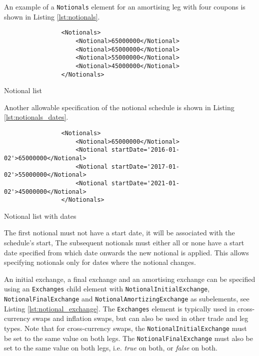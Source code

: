 \begin{itemize}
An example of a \lstinline!Notionals! element for an amortising leg with four coupons is shown in Listing \ref{lst:notionals}.
\begin{listing}[H]
\begin{verbatim}
                <Notionals>
                    <Notional>65000000</Notional>
                    <Notional>65000000</Notional>
                    <Notional>55000000</Notional>
                    <Notional>45000000</Notional>
                </Notionals>
\end{verbatim}
\caption{Notional list}
\label{lst:notionals}
\end{listing}

Another allowable specification of the notional schedule is shown in Listing \ref{lst:notionals_dates}. 
\begin{listing}[H]
\begin{verbatim}
                <Notionals>
                    <Notional>65000000</Notional>
                    <Notional startDate='2016-01-02'>65000000</Notional>
                    <Notional startDate='2017-01-02'>55000000</Notional>
                    <Notional startDate='2021-01-02'>45000000</Notional>
                </Notionals>
\end{verbatim}
\caption{Notional list with dates}
\label{lst:notionals_dates}
\end{listing}
The first notional must not have a start date, it will be associated
with the schedule's start, The subsequent notionals must either all or none have a start
date specified from which date onwards the new notional is applied. This allows
specifying notionals only for dates where the notional changes. 

\vspace{1em} 

An initial exchange, a final exchange
and an amortising exchange can be specified using an \lstinline!Exchanges! child element with \break
\lstinline!NotionalInitialExchange!, \lstinline!NotionalFinalExchange! and \break
\lstinline!NotionalAmortizingExchange! as subelements, see Listing
\ref{lst:notional_exchange}. The \lstinline!Exchanges! element is typically used in cross-currency swaps and inflation swaps, but can also be used in other trade and leg types. Note that for cross-currency swaps, the \lstinline!NotionalInitialExchange! must be set to the same value on both legs. The \lstinline!NotionalFinalExchange! must also be set to the same value on both legs, i.e. \emph{true} on both, or \emph{false} on both.



\end{itemize}
